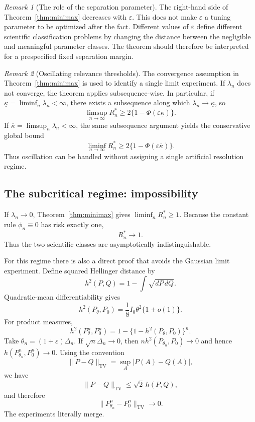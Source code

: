 \documentclass[11pt]{article}
\theoremstyle{remark}
\newtheorem{remark}{Remark}
\begin{document}
\begin{remark}[The role of the separation parameter]
The right-hand side of Theorem~\ref{thm:minimax} decreases with $\varepsilon$. This does not make $\varepsilon$ a tuning parameter to be optimized after the fact. Different values of $\varepsilon$ define different scientific classification problems by changing the distance between the negligible and meaningful parameter classes. The theorem should therefore be interpreted for a prespecified fixed separation margin.
\end{remark}

\begin{remark}[Oscillating relevance thresholds]
The convergence assumption in Theorem~\ref{thm:minimax} is used to identify a single limit experiment. If $\lambda_n$ does not converge, the theorem applies subsequence-wise. In particular, if $\underline\kappa=\liminf_n\lambda_n<\infty$, there exists a subsequence along which $\lambda_n\to\underline\kappa$, so
\[
\limsup_{n\to\infty}R_n^*\ge 2\{1-\Phi(\varepsilon\underline\kappa)\}.
\]
If $\overline\kappa=\limsup_n\lambda_n<\infty$, the same subsequence argument yields the conservative global bound
\[
\liminf_{n\to\infty}R_n^*\ge 2\{1-\Phi(\varepsilon\overline\kappa)\}.
\]
Thus oscillation can be handled without assigning a single artificial resolution regime.
\end{remark}

\subsection{The subcritical regime: impossibility}

If $\lambda_n\to0$, Theorem~\ref{thm:minimax} gives $\liminf_nR_n^*\ge1$. Because the constant rule $\phi_n\equiv0$ has risk exactly one,
\[
R_n^*\to1.
\]
Thus the two scientific classes are asymptotically indistinguishable.

For this regime there is also a direct proof that avoids the Gaussian limit experiment. Define squared Hellinger distance by
\[
h^2(P,Q)=1-\int\sqrt{dP\,dQ}.
\]
Quadratic-mean differentiability gives
\[
h^2(P_\theta,P_0)=\frac18I_0\theta^2\{1+o(1)\}.
\]
For product measures,
\[
h^2(P_\theta^n,P_0^n)
=
1-\{1-h^2(P_\theta,P_0)\}^n.
\]
Take $\theta_n=(1+\varepsilon)\Delta_n$. If $\sqrt n\Delta_n\to0$, then $n h^2(P_{\theta_n},P_0)\to0$ and hence $h(P_{\theta_n}^n,P_0^n)\to0$. Using the convention
\[
\|P-Q\|_{\mathrm{TV}}=\sup_A|P(A)-Q(A)|,
\]
we have
\[
\|P-Q\|_{\mathrm{TV}}\le\sqrt2\,h(P,Q),
\]
and therefore
\[
\|P_{\theta_n}^n-P_0^n\|_{\mathrm{TV}}\to0.
\]
The experiments literally merge.
\end{document}
